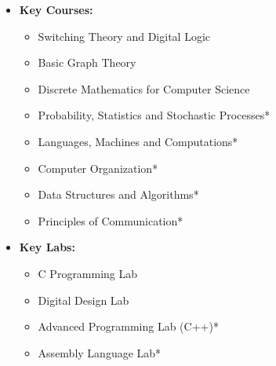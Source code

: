 \documentclass[letterpaper,11pt]{resume}
\begin{document}
\begin{multicols}{2}
{{ \begin{itemize}
    \item{\bf Key Courses:}
     {\begin{itemize}
        \item  {Switching Theory and Digital Logic}
	\item {Basic Graph Theory}
	\item {Discrete Mathematics for Computer Science}
	\item Probability, Statistics and Stochastic Processes*
	\item Languages, Machines and Computations*
   
	\item {Computer Organization*}
        
        \item {Data Structures and Algorithms}*
        \item Principles of Communication*
        
        
           \end{itemize}
      }	
      \end{itemize}
    }
 \begin{itemize}
 \item {\bf Key Labs:}
 {
  \begin{itemize}
    \item {C Programming Lab}
    \item {Digital Design Lab}
    \item Advanced Programming Lab (C++)* \let\thefootnote\relax{} 
    \item Assembly Language Lab* 
  \end{itemize}
 }
\end{itemize}
\vspace{5em}
%    
}
\end{multicols}
\end{document}
